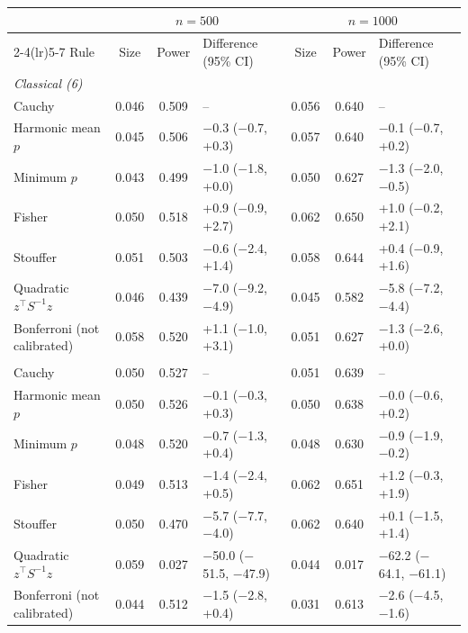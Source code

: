 \begin{tabular}{lcclccl}
\toprule
 & \multicolumn{3}{c}{$n=500$} & \multicolumn{3}{c}{$n=1000$} \\
\cmidrule(lr){2-4}\cmidrule(lr){5-7}
Rule & Size & Power & Difference (95\% CI) & Size & Power & Difference (95\% CI) \\
\midrule
\multicolumn{7}{l}{\emph{Classical (6)}} \\
Cauchy & 0.046 & 0.509 & -- & 0.056 & 0.640 & -- \\
Harmonic mean $p$ & 0.045 & 0.506 & $-$0.3 ($-$0.7, +0.3) & 0.057 & 0.640 & $-$0.1 ($-$0.7, +0.2) \\
Minimum $p$ & 0.043 & 0.499 & $-$1.0 ($-$1.8, +0.0) & 0.050 & 0.627 & $-$1.3 ($-$2.0, $-$0.5) \\
Fisher & 0.050 & 0.518 & +0.9 ($-$0.9, +2.7) & 0.062 & 0.650 & +1.0 ($-$0.2, +2.1) \\
Stouffer & 0.051 & 0.503 & $-$0.6 ($-$2.4, +1.4) & 0.058 & 0.644 & +0.4 ($-$0.9, +1.6) \\
Quadratic $z^\top S^{-1}z$ & 0.046 & 0.439 & $-$7.0 ($-$9.2, $-$4.9) & 0.045 & 0.582 & $-$5.8 ($-$7.2, $-$4.4) \\
Bonferroni (not calibrated) & 0.058 & 0.520 & +1.1 ($-$1.0, +3.1) & 0.051 & 0.627 & $-$1.3 ($-$2.6, +0.0) \\
\addlinespace
\multicolumn{7}{l}{\emph{Full (14)}} \\
Cauchy & 0.050 & 0.527 & -- & 0.051 & 0.639 & -- \\
Harmonic mean $p$ & 0.050 & 0.526 & $-$0.1 ($-$0.3, +0.3) & 0.050 & 0.638 & $-$0.0 ($-$0.6, +0.2) \\
Minimum $p$ & 0.048 & 0.520 & $-$0.7 ($-$1.3, +0.4) & 0.048 & 0.630 & $-$0.9 ($-$1.9, $-$0.2) \\
Fisher & 0.049 & 0.513 & $-$1.4 ($-$2.4, +0.5) & 0.062 & 0.651 & +1.2 ($-$0.3, +1.9) \\
Stouffer & 0.050 & 0.470 & $-$5.7 ($-$7.7, $-$4.0) & 0.062 & 0.640 & +0.1 ($-$1.5, +1.4) \\
Quadratic $z^\top S^{-1}z$ & 0.059 & 0.027 & $-$50.0 ($-$51.5, $-$47.9) & 0.044 & 0.017 & $-$62.2 ($-$64.1, $-$61.1) \\
Bonferroni (not calibrated) & 0.044 & 0.512 & $-$1.5 ($-$2.8, +0.4) & 0.031 & 0.613 & $-$2.6 ($-$4.5, $-$1.6) \\
\bottomrule
\end{tabular}
